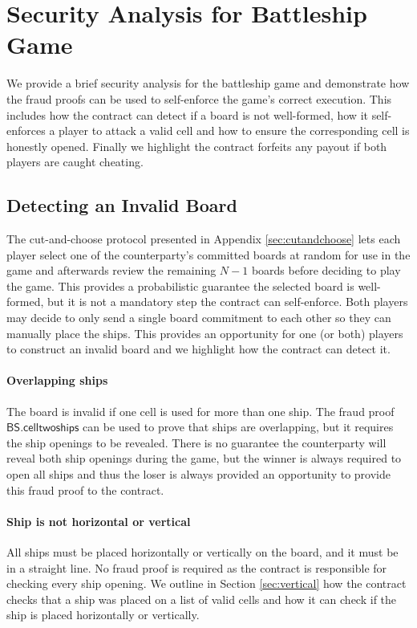 \documentclass{llncs}
\newcommand{\battleshiptwoships}{\mathsf{BS.celltwoships}}
\begin{document}
	
	
	\appendix
	
	
	
	\section{Security Analysis for Battleship Game} \label{sec:secanalysis}
	
	We provide a brief security analysis for the battleship game and demonstrate how the fraud proofs can be used to self-enforce the game's correct execution.
	This includes how the contract can detect if a board is not well-formed, how it self-enforces a player to attack a valid cell and how to ensure the corresponding cell is honestly opened. 
	Finally we highlight the contract forfeits any payout if both players are caught cheating. 
	
	\subsection{Detecting an Invalid Board}
	
	The cut-and-choose protocol presented in Appendix \ref{sec:cutandchoose} lets each player select one of the counterparty's committed boards at random for use in the game and afterwards review the remaining $N-1$ boards before deciding to play the game. 
	This provides a probabilistic guarantee the selected board is well-formed, but it is not a mandatory step the contract can self-enforce. 
	Both players may decide to only send a single board commitment to each other so they can manually place the ships. 
	This provides an opportunity for one (or both) players to construct an invalid board and we highlight how the contract can detect it.  
	
	\paragraph{Overlapping ships}
	The board is invalid if one cell is used for more than one ship. 
	The fraud proof $\battleshiptwoships$ can be used to prove that ships are overlapping, but it requires the ship openings to be revealed. 
	There is no guarantee the counterparty will reveal both ship openings during the game, but the winner is always required to open all ships and thus the loser is always provided an opportunity to provide this fraud proof to the contract. 
	
	\paragraph{Ship is not horizontal or vertical}
	All ships must be placed horizontally or vertically on the board, and it must be in a straight line. 
	No fraud proof is required as the contract is responsible for checking every ship opening. 
	We outline in Section \ref{sec:vertical} how the contract checks that a ship was placed on a list of valid cells and how it can check if the ship is placed horizontally or vertically. 
	
\end{document}
